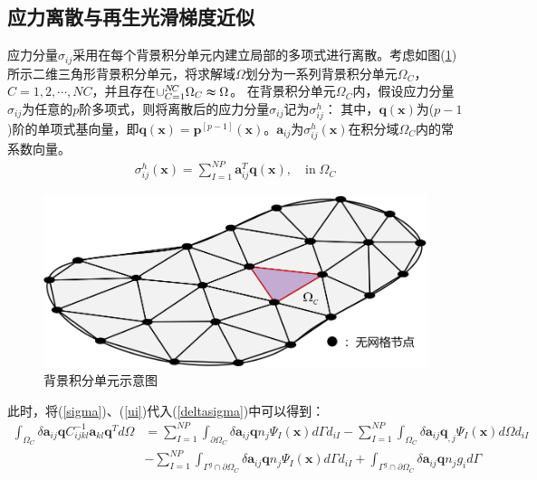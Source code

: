 \subsection{应力离散与再生光滑梯度近似}
应力分量$\sigma_{ij}$采用在每个背景积分单元内建立局部的多项式进行离散。考虑如图(\ref{background})所示二维三角形背景积分单元，将求解域$\Omega$划分为一系列背景积分单元$\Omega_C$，$C=1,2,\dotsb,N\!C$，并且存在$\cup_{C=1}^{N\!C}\Omega_C\thickapprox\Omega$。
在背景积分单元$\Omega_C$内，假设应力分量$\sigma_{ij}$为任意的$p$阶多项式，则将离散后的应力分量$\sigma_{ij}$记为$\sigma^h_{ij}$：
其中，$\pmb{q}(\pmb{x})$为($p-1$)阶的单项式基向量，即$\pmb{q}(\pmb{x})=\pmb{p}^{[p-1]}(\pmb{x})$。$\pmb{a}_{ij}$为$\sigma_{ij}^h(\pmb{x})$在积分域$\Omega_C$内的常系数向量。\\
\begin{equation}\label{sigma}
\begin{split}
    \sigma^h_{ij}(\pmb{x})=\sum_{I=1}^{N\!P}\pmb{a}_{ij}^T\pmb{q}(\pmb{x}),\quad\text{in}\;\Omega_C
\end{split}
\end{equation}
\begin{figure}[!h]
    \centering
    \includegraphics[scale=0.7]{figure/E/background.png}
    \caption{背景积分单元示意图}\label{background}
\end{figure}
此时，将(\ref{sigma})、(\ref{ui})代入(\ref{deltasigma})中可以得到：
\begin{equation}
\begin{split}
    \int_{\Omega_C}\delta\pmb{a}_{ij}\pmb{q}C^{-1}_{ijkl}\pmb{a}_{kl}\pmb{q}^Td\Omega&=\sum_{I=1}^{N\!P}\int_{\partial\Omega_C}\delta\pmb{a}_{ij}\pmb{q}n_j\Psi_I(\pmb{x})d\Gamma d_{iI}-\sum_{I=1}^{N\!P}\int_{\Omega_C}\delta\pmb{a}_{ij}\pmb{q}_{,j}\Psi_{I}(\pmb{x})d\Omega d_{iI}\\
     &-\sum_{I=1}^{N\!P}\int_{\Gamma^g\cap\partial\Omega_C}\delta\pmb{a}_{ij}\pmb{q}n_j\Psi_I(\pmb{x})d\Gamma d_{iI}+\int_{\Gamma^g\cap\partial\Omega_C}\delta\pmb{a}_{ij}\pmb{q}n_jg_id\Gamma
\end{split}
\end{equation}
